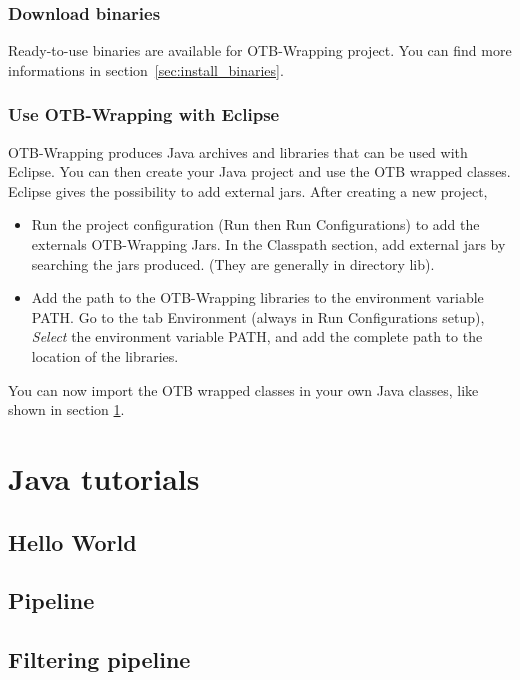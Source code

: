 \subsubsection{Download binaries}

Ready-to-use binaries are available for OTB-Wrapping project. You can find more informations in section~\ref{sec:install_binaries}. 

\subsubsection{Use OTB-Wrapping with Eclipse}
OTB-Wrapping produces Java archives and libraries that can be used with Eclipse. You can then create your Java 
project and use the OTB wrapped classes. 
Eclipse gives the possibility to add external jars. 
After creating a new project, 
\begin{itemize}
\item Run the project configuration (Run then Run Configurations) to add the externals OTB-Wrapping Jars.
      In the Classpath section, add external jars by searching the jars produced. (They are generally in directory lib).
\item Add the path to the OTB-Wrapping libraries to  the environment variable PATH. Go to the tab Environment 
      (always in Run Configurations setup), \emph{Select} the environment variable PATH, and add the complete path 
      to the location of the libraries.
\end{itemize}

You can now import the OTB wrapped classes in your own Java classes, like shown in section \ref{sec:tuto}.


\normalsize

\section{Java tutorials}\label{sec:tuto}
\subsection{Hello World}
% 

\subsection{Pipeline}
% 

\subsection{Filtering pipeline}
%

